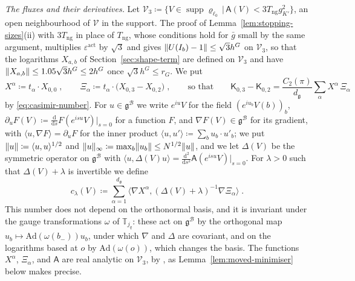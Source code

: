 \documentclass[11pt]{preprint}
\newcommand{\dd}{\mathrm{d}}
\DeclarePairedDelimiter{\norm}{\lVert}{\rVert}
\numberwithin{equation}{section}
\theoremstyle{definition}
\theoremstyle{remark}
\theoremstyle{plain}
\begin{document}
\emph{The fluxes and their derivatives.} Let $\mathcal V_3 \coloneqq \{ V \in \operatorname{supp}\varrho_{\ell_0} \,|\, \mathsf A(V) < 3T_{\mathrm{ng}}g_{K'}^2 \}$, an open neighbourhood of $\mathcal V$ in the support. The proof of Lemma~\ref{lem:stopping-sizes}(ii) with $3T_{\mathrm{ng}}$ in place of $T_{\mathrm{ng}}$, whose conditions hold for $\bar g$ small by the same argument, multiplies $\varepsilon^{\mathrm{act}}$ by $\sqrt3$ and gives $\norm{U(I_b) - 1} \leq \sqrt3h^G$ on $\mathcal V_3$, so that the logarithms $X_{a,b}$ of Section~\ref{sec:shape-term} are defined on $\mathcal V_3$ and have $\norm{X_{a,b}} \leq 1.05\sqrt3h^G \leq 2h^G$ once $\sqrt3h^G \leq r_G$. We put
\begin{equation}\label{eq:flux-coordinates}
    X^\alpha \coloneqq t_\alpha \cdot X_{0,0}\;,
    \qquad
    \Xi_\alpha \coloneqq t_\alpha \cdot \bigl(X_{0,3} - X_{0,2}\bigr)\;,
    \qquad\text{so that}\qquad
    \mathsf K_{0,3} - \mathsf K_{0,2} = \frac{C_2(\pi)}{d_{\mathfrak g}}\sum_\alpha X^\alpha\,\Xi_\alpha
\end{equation}
by \eqref{eq:casimir-number}. For $u \in \mathfrak g^{\mathcal B}$ we write $e^{iu}V$ for the field $(e^{iu_b}V(b))_b$, $\partial_uF(V) \coloneqq \frac{\dd}{\dd s}F(e^{isu}V)|_{s=0}$ for a function $F$, and $\nabla F(V) \in \mathfrak g^{\mathcal B}$ for its gradient, with $\langle u, \nabla F\rangle = \partial_uF$ for the inner product $\langle u, u'\rangle \coloneqq \sum_bu_b \cdot u'_b$; we put $\norm u \coloneqq \langle u, u\rangle^{1/2}$ and $\norm u_\infty \coloneqq \max_b\norm{u_b} \leq N^{1/2}\norm u$, and we let $\Delta(V)$ be the symmetric operator on $\mathfrak g^{\mathcal B}$ with $\langle u, \Delta(V)u\rangle = \frac{\dd^2}{\dd s^2}\mathsf A(e^{isu}V)|_{s=0}$. For $\lambda > 0$ such that $\Delta(V) + \lambda$ is invertible we define
\begin{equation}\label{eq:c-lambda}
    c_\lambda(V) \coloneqq \sum_{\alpha=1}^{d_{\mathfrak g}}\bigl\langle\nabla X^\alpha, (\Delta(V) + \lambda)^{-1}\nabla\Xi_\alpha\bigr\rangle\;.
\end{equation}
This number does not depend on the orthonormal basis, and it is invariant under the gauge transformations $\omega$ of $\mathbb T_{j_q}$: these act on $\mathfrak g^{\mathcal B}$ by the orthogonal map $u_b \mapsto \mathrm{Ad}(\omega(b_-))u_b$, under which $\nabla$ and $\Delta$ are covariant, and on the logarithms based at $o$ by $\mathrm{Ad}(\omega(o))$, which changes the basis. The functions $X^\alpha$, $\Xi_\alpha$, and $\mathsf A$ are real analytic on $\mathcal V_3$, by \cite[Proposition~9, p.~309]{BalabanVAR}, as Lemma~\ref{lem:moved-minimiser} below makes precise.
\end{document}
